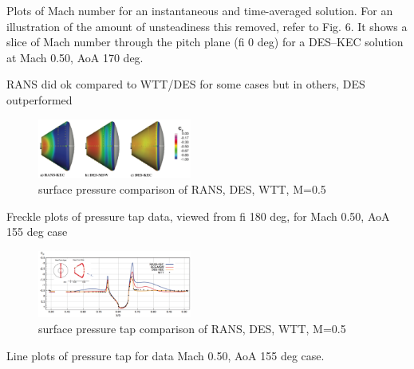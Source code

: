 \documentclass[journal]{new-aiaa}
\begin{document}
Plots of Mach number for an instantaneous and time-averaged solution.
For an illustration of the amount of unsteadiness this removed, refer to Fig. 6. It shows a slice of Mach number through the pitch plane (fi   0 deg) for a DES–KEC solution at Mach 0.50, AoA   170 deg.



RANS did ok compared to WTT/DES for some cases but in others, DES outperformed


\begin{figure}[H]
\begin{center}
\includegraphics[width=0.45\textwidth]{Images/logan/schwing2015detachededdy_surfacepressure.pdf}
\caption{ surface pressure comparison of RANS, DES, WTT, M=0.5 \cite{schwing2015detachededdy} }
\label{fig:orionpressure}
\end{center}
\end{figure}

Freckle plots of pressure tap data, viewed from fi  180 deg, for Mach 0.50, AoA   155 deg case


\begin{figure}[H]
\begin{center}
\includegraphics[width=0.45\textwidth]{Images/logan/schwing2015detachededdy_surfacetaps.pdf}
\caption{ surface pressure tap comparison of RANS, DES, WTT, M=0.5 \cite{schwing2015detachededdy} }
\label{fig:orionpressuretaps}
\end{center}
\end{figure}

Line plots of pressure tap for data Mach 0.50, AoA   155 deg case.
\end{document}
